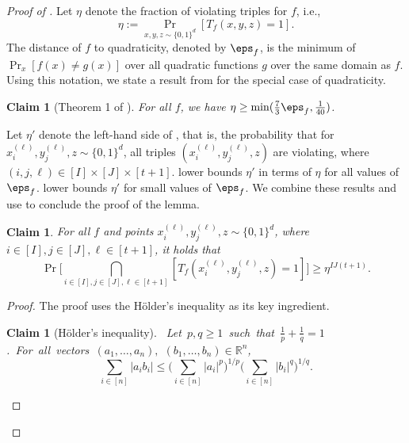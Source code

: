 \documentclass[11pt]{article}
\numberwithin{equation}{section}
\newtheorem{claim}[theorem]{Claim}
\theoremstyle{definition}
\theoremstyle{plain}
\newcommand{\R}{\mathbb R}
\begin{document}
\begin{proof}[Proof of ]
Let $\eta$ denote the fraction of violating triples for $f$, i.e.,
\begin{equation*}
   \eta := \Pr_{x,y,z \sim \{0,1\}^d}[T_f(x,y,z) = 1].
\end{equation*}
The distance of $f$ to quadraticity, denoted by $\eps_f$, is the minimum of $\Pr_x[f(x)\neq g(x)]$ over all quadratic functions $g$ over the same domain as $f$.
Using this notation, we state a result from \cite{AlonKKLR05} for the special case of quadraticity.

\begin{claim}[Theorem 1 of \cite{AlonKKLR05}]\label{clm:bat}
For all $f$, we have $\eta \geq \min( \frac{7}{3}\eps_f, \frac{1}{40})$.
\end{claim}

 Let $\eta'$ denote the left-hand side of , that is, the probability that for $x_i^{(\ell)}, y_j^{(\ell)}, z \sim \{0,1\}^d$,  all triples $(x_i^{(\ell)}, y_j^{(\ell)}, z)$ are violating, where  $(i,j,\ell) \in [I]\times [J]\times [t+1]$.  lower bounds $\eta'$ in terms of $\eta$ for all values of $\eps_f$.  lower bounds $\eta'$ for small values of $\eps_f$. We  combine these results and use  to conclude the proof of the lemma. 
    
\begin{claim} \label{clm:quadratic_cauchy}
For all $f$  and points $x_i^{(\ell)}, y_j^{(\ell)}, z \sim \{0,1\}^d$, where $i \in [I], j\in[J], \ell\in[t+1]$, it holds that
\begin{equation*}
  \Pr\Big[ \bigcap_{i \in [I], j\in[J], \ell\in[t+1]}[T_f(x_i^{(\ell)}, y_j^{(\ell)}, z) = 1] \Big] \geq  \eta^{IJ(t+1)}.
\end{equation*}
\end{claim}
\begin{proof}
    The proof uses the H\"{o}lder's inequality as its key ingredient. 

  
    \begin{claim}[H\"{o}lder's inequality]\ Let\ $p, q \geq 1$\ such\ that\
      $\frac 1p+\frac 1q=1$.\ For\ all\ vectors\ $(a_1, \dots, a_n),$
 $(b_1, \dots, b_n) \in \R^{n}$,  %
    \begin{equation*}
        \sum_{i \in [n]}  |a_ib_i| \leq \Big( \sum_{i \in [n]}  |a_i|^{p} \Big)^{1/p} \Big( \sum_{i \in [n]}  |b_i|^{q} \Big)^{1/q}.
    \end{equation*}
    \end{claim}
  

\end{proof}
\end{proof}
\end{document}
